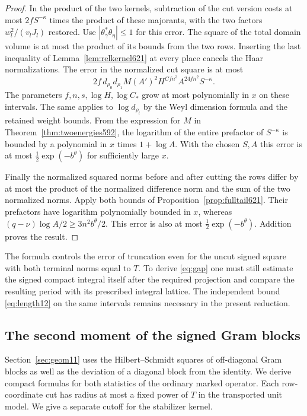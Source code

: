 \documentclass[a4paper,11pt]{article}
\theoremstyle{definition}
\theoremstyle{remark}
\numberwithin{equation}{section}
\begin{document}
\begin{proof}
In the product of the two kernels, subtraction of the cut
version costs at most \(2f S^{-\kappa}\) times the product of
these majorants, with the two factors \(w_l^2/(v_lJ_l)\)
restored. Use \(|\theta_\gamma^*\theta_\eta|\le1\) for this
error. The square of the total domain volume is at most the
product of its bounds from the two rows. Inserting the last
inequality of Lemma~\ref{lem:relkernel621} at every place
cancels the Haar normalizations. The error in the normalized
cut square is at most
\[
     2 f\,d_{\rho_0}d_{\rho_1} M(A')^2
                    H^{C f n^3} A^{24 f n^2} S^{-\kappa}.
\]
The parameters \(f,n,s,\log H,\log C_*\) grow at most
polynomially in \(x\) on these intervals. The same applies
to \(\log d_{\rho_l}\) by the Weyl dimension formula and the
retained weight bounds. From the expression for \(M\) in
Theorem~\ref{thm:twoenergies592}, the logarithm of the entire
prefactor of \(S^{-\kappa}\) is bounded by a polynomial in
\(x\) times \(1+\log A\). With the chosen \(S,A\) this error
is at most \(\frac12\exp(-b^\theta)\) for sufficiently large
\(x\).

Finally the normalized squared norms before and after cutting
the rows differ by at most the product of the normalized
difference norm and the sum of the two normalized norms.
Apply both bounds of Proposition~\ref{prop:fulltail621}.
Their prefactors have logarithm polynomially bounded in \(x\),
whereas \((q-\nu)\log A/2\ge 3n^2 b^\theta/2\).
This error is also at most \(\frac12\exp(-b^\theta)\).
Addition proves the result.
\end{proof}

The formula controls the error of truncation even for the
uncut signed square with both terminal norms equal to \(T\).
To derive \eqref{eq:gap} one must still estimate the signed
compact integral itself after the required projection and
compare the resulting period with its prescribed integral
lattice. The independent bound \eqref{eq:length12} on the same
intervals remains necessary in the present reduction.


\subsection{The second moment of the signed Gram blocks}
\label{sec:fourkernels622}

Section~\ref{sec:geom11} uses the Hilbert--Schmidt squares of
off-diagonal Gram blocks as well as the deviation of a diagonal
block from the identity. We derive compact formulas for both
statistics of the ordinary marked operator. Each row-coordinate
cut has radius at most a fixed power of \(T\) in the transported
unit model. We give a separate cutoff for the stabilizer kernel.
\end{document}

